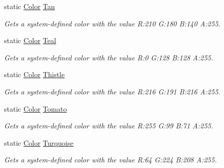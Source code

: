 \begin{DoxyCompactItemize}
static \hyperlink{struct_microsoft_1_1_xna_1_1_framework_1_1_color}{Color} \hyperlink{struct_microsoft_1_1_xna_1_1_framework_1_1_color_a3010b3b108193484cc3c260309eb723d}{Tan}
\begin{DoxyCompactList}\small\item\em Gets a system-\/defined color with the value R\+:210 G\+:180 B\+:140 A\+:255.\end{DoxyCompactList}\item 
static \hyperlink{struct_microsoft_1_1_xna_1_1_framework_1_1_color}{Color} \hyperlink{struct_microsoft_1_1_xna_1_1_framework_1_1_color_a2002b35d79304a452a1d6479027bd7ca}{Teal}
\begin{DoxyCompactList}\small\item\em Gets a system-\/defined color with the value R\+:0 G\+:128 B\+:128 A\+:255.\end{DoxyCompactList}\item 
static \hyperlink{struct_microsoft_1_1_xna_1_1_framework_1_1_color}{Color} \hyperlink{struct_microsoft_1_1_xna_1_1_framework_1_1_color_ae414b46eefc7d14f649fc2a4f8a286d7}{Thistle}
\begin{DoxyCompactList}\small\item\em Gets a system-\/defined color with the value R\+:216 G\+:191 B\+:216 A\+:255.\end{DoxyCompactList}\item 
static \hyperlink{struct_microsoft_1_1_xna_1_1_framework_1_1_color}{Color} \hyperlink{struct_microsoft_1_1_xna_1_1_framework_1_1_color_a28ec498f89063532f36aa506d47cdb56}{Tomato}
\begin{DoxyCompactList}\small\item\em Gets a system-\/defined color with the value R\+:255 G\+:99 B\+:71 A\+:255.\end{DoxyCompactList}\item 
static \hyperlink{struct_microsoft_1_1_xna_1_1_framework_1_1_color}{Color} \hyperlink{struct_microsoft_1_1_xna_1_1_framework_1_1_color_a7e855c7c34c4e0f756c70cf000e3738e}{Turquoise}
\begin{DoxyCompactList}\small\item\em Gets a system-\/defined color with the value R\+:64 G\+:224 B\+:208 A\+:255.\end{DoxyCompactList}\item 

\end{DoxyCompactItemize}
